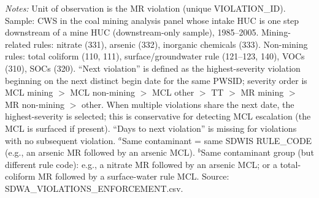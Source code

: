 \begin{table}[htbp]
\begin{minipage}{\linewidth}
\footnotesize
\textit{Notes:} Unit of observation is the MR violation (unique VIOLATION\_ID). Sample: CWS in the coal mining analysis panel whose intake HUC is one step downstream of a mine HUC (downstream-only sample), 1985--2005. Mining-related rules: nitrate (331), arsenic (332), inorganic chemicals (333). Non-mining rules: total coliform (110, 111), surface/groundwater rule (121--123, 140), VOCs (310), SOCs (320). ``Next violation'' is defined as the highest-severity violation beginning on the next distinct begin date for the same PWSID; severity order is MCL mining $>$ MCL non-mining $>$ MCL other $>$ TT $>$ MR mining $>$ MR non-mining $>$ other. When multiple violations share the next date, the highest-severity is selected; this is conservative for detecting MCL escalation (the MCL is surfaced if present). ``Days to next violation'' is missing for violations with no subsequent violation. $^a$Same contaminant = same SDWIS RULE\_CODE (e.g., an arsenic MR followed by an arsenic MCL). $^b$Same contaminant group (but different rule code): e.g., a nitrate MR followed by an arsenic MCL; or a total-coliform MR followed by a surface-water rule MCL. Source: SDWA\_VIOLATIONS\_ENFORCEMENT.csv.
\end{minipage}
\end{table}
